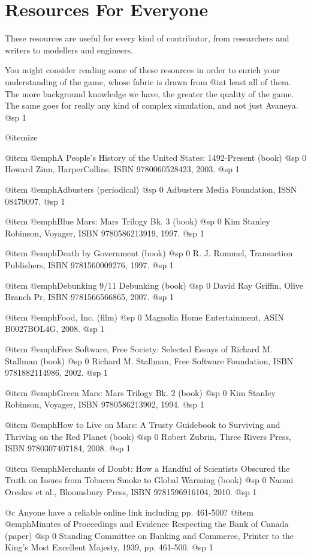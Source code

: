 \section{Resources For Everyone}
These resources are useful for every kind of contributor, from researchers and writers to modellers and engineers.

You might consider reading some of these resources in order to enrich your understanding of the game, whose fabric is drawn from @i{at least} all of them. The more background knowledge we have, the greater the quality of the game. The same goes for really any kind of complex simulation, and not just Avaneya.
@sp 1

@itemize

@item
@emph{A People's History of the United States: 1492-Present} (book)
@sp 0
Howard Zinn, HarperCollins, ISBN 9780060528423, 2003.
@sp 1

@item
@emph{Adbusters} (periodical)
@sp 0
Adbusters Media Foundation, ISSN 08479097.
@sp 1

@item
@emph{Blue Mars: Mars Trilogy Bk. 3} (book)
@sp 0
Kim Stanley Robinson, Voyager, ISBN 9780586213919, 1997.
@sp 1

@item
@emph{Death by Government} (book)
@sp 0
R. J. Rummel, Transaction Publishers, ISBN 9781560009276, 1997.
@sp 1

@item
@emph{Debunking 9/11 Debunking} (book)
@sp 0
David Ray Griffin, Olive Branch Pr, ISBN 9781566566865, 2007.
@sp 1

@item
@emph{Food, Inc.} (film)
@sp 0
Magnolia Home Entertainment, ASIN B0027BOL4G, 2008.
@sp 1

@item
@emph{Free Software, Free Society: Selected Essays of Richard M. Stallman} (book)
@sp 0
Richard M. Stallman, Free Software Foundation, ISBN 9781882114986, 2002.
@sp 1

@item
@emph{Green Mars: Mars Trilogy Bk. 2} (book)
@sp 0
Kim Stanley Robinson, Voyager, ISBN 9780586213902, 1994.
@sp 1

@item
@emph{How to Live on Mars: A Trusty Guidebook to Surviving and Thriving on the Red Planet} (book)
@sp 0
Robert Zubrin, Three Rivers Press, ISBN 9780307407184, 2008.
@sp 1

@item
@emph{Merchants of Doubt: How a Handful of Scientists Obscured the Truth on Issues from Tobacco Smoke to Global Warming} (book)
@sp 0
Naomi Oreskes et al., Bloomsbury Press, ISBN 9781596916104, 2010.
@sp 1

@c Anyone have a reliable online link including pp. 461-500?
@item
@emph{Minutes of Proceedings and Evidence Respecting the Bank of Canada} (paper)
@sp 0
Standing Committee on Banking and Commerce, Printer to the King's Most Excellent Majesty, 1939, pp. 461-500.
@sp 1

